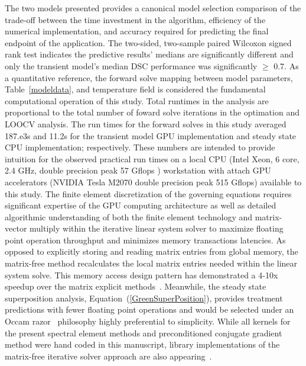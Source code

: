 \documentclass[12pt]{article}
\newcommand{\eqn}[1]{(\ref{#1})}
\begin{document}
The two models presented provides a canonical model selection comparison of the
trade-off between the time investment in the algorithm, efficiency of the
numerical implementation, and accuracy required for predicting the final endpoint
of the application. The two-sided, two-sample paired Wilcoxon signed rank test
indicates the predictive results' medians are significantly different and
only the transient model's median DSC performance was significantly
$\geq$ 0.7. 
{\color{red}
As a quantitative reference,
the forward solve mapping between model parameters, Table~\ref{modeldata}, 
and temperature field is considered the fundamental computational
operation of this study.
Total runtimes in the analysis are  proportional to the total number of foward solve
iterations in the optimation and LOOCV analysis. 
The run times for the forward solves in this study 
averaged 187.e3s and 11.2s for the transient model GPU implementation 
and steady state CPU implementation; respectively. 
These numbers are intended to provide intuition for the observed
practical run times on a local CPU 
(Intel Xeon, 6 core, 2.4 GHz, double precision peak 57 Gflops )  
workstation with attach GPU accelerators
(NVIDIA Tesla M2070 double precision peak 515 Gflops) 
available to this study.
}
The finite element discretization of the governing equations requires significant
expertise of the GPU computing architecture as well as detailed algorithmic
understanding of both the finite element technology and matrix-vector multiply
within the iterative linear system solver to maximize floating point operation
throughput and minimizes memory transactions latencies.
As opposed to explicitly storing and reading matrix entries
from global memory, the matrix-free method recalculates the local matrix entries
needed within the linear system solve.
This memory access design pattern has demonstrated a 4-10x speedup  over
the matrix explicit methods~\cite{Muller2013,Knepley_2_2013,Medina2014}.
Meanwhile, the steady state superposition analysis, Equation~\eqn{GreenSuperPosition},
provides treatment predictions with fewer floating point operations and would be selected under an Occam
razor~\cite{jaynes2003probability} philosophy highly preferential to simplicity.
While all kernels
for the present spectral element methods and preconditioned conjugate gradient
method were hand coded in this manuscript, library implementations of the
matrix-free iterative solver approach are also
appearing~\cite{Knepley2013,Knepley2014}. 
\end{document}
